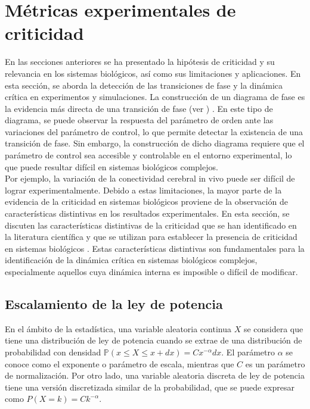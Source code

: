 \section{Métricas experimentales de criticidad}



En las secciones anteriores se ha presentado la hipótesis de criticidad y su relevancia en los sistemas biológicos, así como sus limitaciones y aplicaciones. En esta sección, se aborda la detección de las transiciones de fase y la dinámica crítica en experimentos y simulaciones.
La construcción de un diagrama de fase es la evidencia más directa de una transición de fase (ver  ) \cite{dickman_paths_2000}. En este tipo de diagrama, se puede observar la respuesta del parámetro de orden ante las variaciones del parámetro de control, lo que permite detectar la existencia de una transición de fase. Sin embargo, la construcción de dicho diagrama requiere que el parámetro de control sea accesible y controlable en el entorno experimental, lo que puede resultar difícil en sistemas biológicos complejos.\\

Por ejemplo, la variación de la conectividad cerebral in vivo puede ser difícil de lograr experimentalmente. Debido a estas limitaciones, la mayor parte de la evidencia de la criticidad en sistemas biológicos proviene de la observación de características distintivas en los resultados experimentales. En esta sección, se discuten las características distintivas de la criticidad que se han identificado en la literatura científica y que se utilizan para establecer la presencia de criticidad en sistemas biológicos \cite{hesse_self-organized_2014}. Estas características distintivas son fundamentales para la identificación de la dinámica crítica en sistemas biológicos complejos, especialmente aquellos cuya dinámica interna es imposible o difícil  de modificar.



\subsection{Escalamiento de la ley de potencia}


En el ámbito de la estadística, una variable aleatoria continua $X$ se considera que tiene una distribución de ley de potencia cuando se extrae de una distribución de probabilidad con densidad $	\mathbb{P}\left(x\leq X\leq x+dx\right)=Cx^{-\alpha}dx$. El parámetro $\alpha$ se conoce como el exponente o parámetro de escala, mientras que $C$ es un parámetro de normalización. Por otro lado, una variable aleatoria discreta de ley de potencia tiene una versión discretizada similar de la probabilidad, que se puede expresar como 	$P(X=k)=Ck^{-\alpha}$.\\


